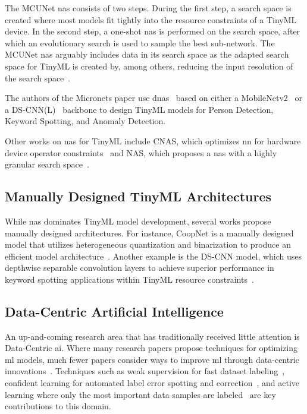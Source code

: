 The MCUNet \gls{nas} consists of two steps.
During the first step, a search space is created where most models fit tightly into the resource constraints of a TinyML device.
In the second step, a one-shot \gls{nas} is performed on the search space, after which an evolutionary search is used to sample the best sub-network.
The MCUNet \gls{nas} arguably includes data in its search space as the adapted search space for TinyML is created by, among others, reducing the input resolution of the search space~\cite{lin2020mcunet}.

The authors of the Micronets paper use \gls{dnas}~\cite{liu2018darts} based on either a MobileNetv2~\cite{sandler2018mobilenetv2} or a DS-CNN(L)~\cite{zhang2017hello} backbone to design TinyML models for Person Detection, Keyword Spotting, and Anomaly Detection.

Other works on \gls{nas} for TinyML include CNAS, which optimizes \gls{nn} for hardware device operator constraints~\cite{gambella2022cnas} and \textmu{}NAS, which proposes a \gls{nas} with a highly granular search space~\cite{liberis2021munas}.

\subsection{Manually Designed TinyML Architectures}
While \gls{nas} dominates TinyML model development, several works propose manually designed architectures.
For instance, CoopNet is a manually designed model that utilizes heterogeneous quantization and binarization to produce an efficient model architecture~\cite{mocerino2019coopnet}.
Another example is the DS-CNN model, which uses depthwise separable convolution layers to achieve superior performance in keyword spotting applications within TinyML resource constraints~\cite{zhang2017hello}.

\subsection{Data-Centric Artificial Intelligence}
An up-and-coming research area that has traditionally received little attention is Data-Centric \gls{ai}.
Where many research papers propose techniques for optimizing \gls{ml} models, much fewer papers consider ways to improve \gls{ml} through data-centric innovations~\cite{mazumder2023dataperf}.
Techniques such as weak supervision for fast dataset labeling~\cite{ratner2017snorkel}, confident learning for automated label error spotting and correction~\cite{northcutt2021confident}, and active learning where only the most important data samples are labeled~\cite{settles2009active} are key contributions to this domain.

